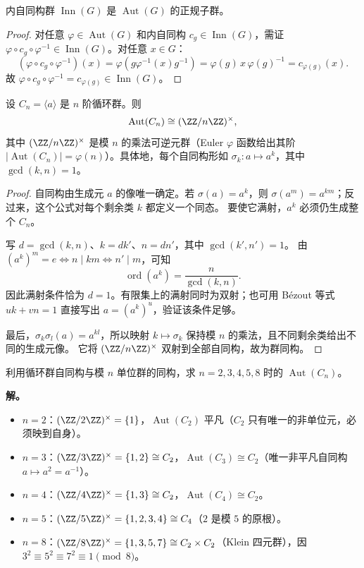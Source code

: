 \begin{proposition}
内自同构群 $\operatorname{Inn}(G)$ 是 $\operatorname{Aut}(G)$ 的正规子群。
\end{proposition}

\begin{proof}
对任意 $\varphi\in\operatorname{Aut}(G)$ 和内自同构 $c_g\in\operatorname{Inn}(G)$，需证 $\varphi\circ c_g\circ\varphi^{-1}\in\operatorname{Inn}(G)$。对任意 $x\in G$：
\[
(\varphi\circ c_g\circ\varphi^{-1})(x)=\varphi(g\varphi^{-1}(x)g^{-1})=\varphi(g)\,x\,\varphi(g)^{-1}=c_{\varphi(g)}(x).
\]
故 $\varphi\circ c_g\circ\varphi^{-1}=c_{\varphi(g)}\in\operatorname{Inn}(G)$。
\end{proof}

\begin{theorem}[循环群的自同构群]
\label{thm:cyclic-aut}
设 $C_n=\langle a\rangle$ 是 $n$ 阶循环群。则
\[
\operatorname{Aut}(C_n)\cong(\ZZ/n\ZZ)^\times,
\]
其中 $(\ZZ/n\ZZ)^\times$ 是模 $n$ 的乘法可逆元群（Euler $\varphi$ 函数给出其阶 $|\operatorname{Aut}(C_n)|=\varphi(n)$）。具体地，每个自同构形如 $\sigma_k:a\mapsto a^k$，其中 $\gcd(k,n)=1$。
\end{theorem}

\begin{proof}
自同构由生成元 $a$ 的像唯一确定。若 $\sigma(a)=a^k$，则
$\sigma(a^m)=a^{km}$；反过来，这个公式对每个剩余类 $k$ 都定义一个同态。
要使它满射，$a^k$ 必须仍生成整个 $C_n$。

写 $d=\gcd(k,n)$、$k=dk'$、$n=dn'$，其中 $\gcd(k',n')=1$。
由 $(a^k)^m=e\iff n\mid km\iff n'\mid m$，可知
\[
\operatorname{ord}(a^k)=\frac n{\gcd(k,n)}.
\]
因此满射条件恰为 $d=1$。有限集上的满射同时为双射；也可用 Bézout 等式
$uk+vn=1$ 直接写出 $a=(a^k)^u$，验证该条件足够。

最后，$\sigma_k\sigma_l(a)=a^{kl}$，所以映射
$k\mapsto\sigma_k$ 保持模 $n$ 的乘法，且不同剩余类给出不同的生成元像。
它将 $(\ZZ/n\ZZ)^\times$ 双射到全部自同构，故为群同构。
\end{proof}

\begin{example}[{小阶循环群的自同构}]
利用循环群自同构与模 $n$ 单位群的同构，求 $n=2,3,4,5,8$ 时的 $\operatorname{Aut}(C_n)$。

\textbf{解。} \begin{itemize}
\item $n=2$：$(\ZZ/2\ZZ)^\times=\{1\}$，$\operatorname{Aut}(C_2)$ 平凡（$C_2$ 只有唯一的非单位元，必须映到自身）。
\item $n=3$：$(\ZZ/3\ZZ)^\times=\{1,2\}\cong C_2$，$\operatorname{Aut}(C_3)\cong C_2$（唯一非平凡自同构 $a\mapsto a^2=a^{-1}$）。
\item $n=4$：$(\ZZ/4\ZZ)^\times=\{1,3\}\cong C_2$，$\operatorname{Aut}(C_4)\cong C_2$。
\item $n=5$：$(\ZZ/5\ZZ)^\times=\{1,2,3,4\}\cong C_4$（$2$ 是模 $5$ 的原根）。
\item $n=8$：$(\ZZ/8\ZZ)^\times=\{1,3,5,7\}\cong C_2\times C_2$（Klein 四元群），因 $3^2\equiv5^2\equiv7^2\equiv1\pmod{8}$。
\end{itemize}
\end{example}

